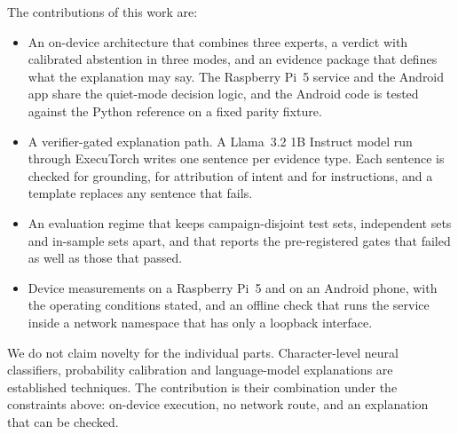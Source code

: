 The contributions of this work are:
\begin{itemize}
  \item An on-device architecture that combines three experts, a verdict with calibrated abstention in three modes, and an evidence package that defines what the explanation may say. The Raspberry Pi~5 service and the Android app share the quiet-mode decision logic, and the Android code is tested against the Python reference on a fixed parity fixture.
  \item A verifier-gated explanation path. A Llama~3.2 1B Instruct model run through ExecuTorch writes one sentence per evidence type. Each sentence is checked for grounding, for attribution of intent and for instructions, and a template replaces any sentence that fails.
  \item An evaluation regime that keeps campaign-disjoint test sets, independent sets and in-sample sets apart, and that reports the pre-registered gates that failed as well as those that passed.
  \item Device measurements on a Raspberry Pi~5 and on an Android phone, with the operating conditions stated, and an offline check that runs the service inside a network namespace that has only a loopback interface.
\end{itemize}

We do not claim novelty for the individual parts. Character-level neural classifiers, probability calibration and language-model explanations are established techniques. The contribution is their combination under the constraints above: on-device execution, no network route, and an explanation that can be checked.
